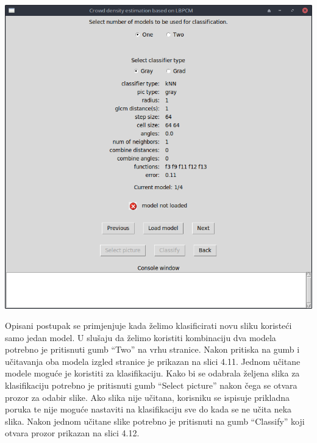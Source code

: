 \documentclass[times, utf8, zavrsni, numeric]{fer}
\begin{document}
\begin{minipage}{\linewidth}
\centering
\includegraphics[scale=0.4]{img/cl1.png}
\end{minipage}

\bigbreak

Opisani postupak se primjenjuje kada želimo klasificirati novu sliku
koristeći samo jedan model. U slušaju da želimo koristiti kombinaciju
dva modela potrebno je pritisnuti gumb \enquote{Two} na vrhu stranice.
Nakon pritiska na gumb i učitavanja oba modela izgled stranice je prikazan
na slici 4.11. Jednom učitane modele moguće je koristiti za klasifikaciju. Kako
bi se odabrala željena slika za klasifikaciju potrebno je pritisnuti 
gumb \enquote{Select picture} nakon čega se otvara prozor za odabir slike.
Ako slika nije učitana, korisniku se ispisuje prikladna poruka te nije moguće 
nastaviti na klasifikaciju sve do kada se ne učita neka slika.
Nakon jednom učitane slike potrebno je pritisnuti na gumb \enquote{Classify} koji 
otvara prozor prikazan na slici 4.12.

\bigbreak 
\end{document}
